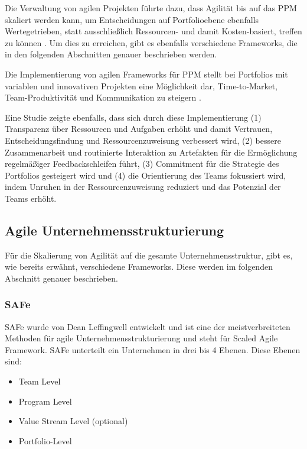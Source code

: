 Die Verwaltung von agilen Projekten führte dazu, dass Agilität bis auf das PPM skaliert werden kann, um Entscheidungen auf Portfolioebene ebenfalls Wertegetrieben, statt ausschließlich Ressourcen- und damit Kosten-basiert, treffen zu können \cite{SUAREZ2022-1}. Um dies zu erreichen, gibt es ebenfalls verschiedene Frameworks, die in den folgenden Abschnitten genauer beschrieben werden.

Die Implementierung von agilen Frameworks für PPM stellt bei Portfolios mit variablen und innovativen Projekten eine Möglichkeit dar, Time-to-Market, Team-Produktivität und Kommunikation zu steigern \cite{SUAREZ2022-2}.

Eine Studie \cite{anEmpiricalPerspectiveOnThePractiveInUse} zeigte ebenfalls, dass sich durch diese Implementierung (1) Transparenz über Ressourcen und Aufgaben erhöht und damit Vertrauen, Entscheidungsfindung und Ressourcenzuweisung verbessert wird, (2) bessere Zusammenarbeit und routinierte Interaktion zu Artefakten für die Ermöglichung regelmäßiger Feedbackschleifen führt, (3) Commitment für die Strategie des Portfolios gesteigert wird und (4) die Orientierung des Teams fokussiert wird, indem Unruhen in der Ressourcenzuweisung reduziert und das Potenzial der Teams erhöht.

\subsection{Agile Unternehmensstrukturierung}
Für die Skalierung von Agilität auf die gesamte Unternehmensstruktur, gibt es, wie bereits erwähnt, verschiedene Frameworks. Diese werden im folgenden Abschnitt genauer beschrieben.

\subsubsection{SAFe}
SAFe wurde von Dean Leffingwell entwickelt und ist eine der meistverbreiteten Methoden für agile Unternehmensstrukturierung und steht für Scaled Agile Framework.
SAFe unterteilt ein Unternehmen in drei bis 4 Ebenen. Diese Ebenen sind:

\begin{itemize}
    \item Team Level
    \item Program Level
    \item Value Stream Level (optional)
    \item Portfolio-Level
\end{itemize}

